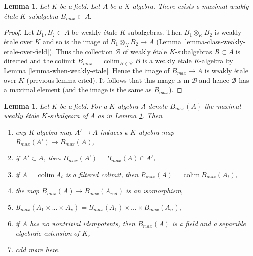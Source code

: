 \documentclass{amsart}
\theoremstyle{plain}
\newtheorem{lemma}[subsection]{Lemma}
\theoremstyle{definition}
\theoremstyle{remark}
\numberwithin{equation}{subsection}
\def\colim{\mathop{\mathrm{colim}}\nolimits}
\begin{document}
\begin{lemma}
\label{lemma-max-weakly-etale-subalgebra}
Let $K$ be a field. Let $A$ be a $K$-algebra. There exists
a maximal weakly \'etale $K$-subalgebra $B_{max} \subset A$.
\end{lemma}

\begin{proof}
Let $B_1, B_2 \subset A$ be weakly \'etale $K$-subalgebras.
Then $B_1 \otimes_K B_2$ is weakly \'etale over $K$
and so is the image of $B_1 \otimes_K B_2 \to A$
(Lemma \ref{lemma-class-weakly-etale-over-field}).
Thus the collection $\mathcal{B}$ of weakly \'etale $K$-subalgebras
$B \subset A$ is directed and the colimit
$B_{max} = \colim_{B \in \mathcal{B}} B$ is
a weakly \'etale $K$-algebra by Lemma \ref{lemma-when-weakly-etale}.
Hence the image of $B_{max} \to A$ is weakly \'etale over $K$
(previous lemma cited). It follows that this image is in $\mathcal{B}$
and hence $\mathcal{B}$ has a maximal element
(and the image is the same as $B_{max}$).
\end{proof}


\begin{lemma}
\label{lemma-properties-of-max-weakly-etale-subalgebra}
Let $K$ be a field. For a $K$-algebra $A$ denote $B_{max}(A)$
the maximal weakly \'etale $K$-subalgebra of $A$ as in
Lemma \ref{lemma-max-weakly-etale-subalgebra}. Then
\begin{enumerate}
\item any $K$-algebra map $A' \to A$ induces a $K$-algebra map
$B_{max}(A') \to B_{max}(A)$,
\item if $A' \subset A$, then $B_{max}(A') = B_{max}(A) \cap A'$,
\item if $A = \colim A_i$ is a filtered colimit, then
$B_{max}(A) = \colim B_{max}(A_i)$,
\item the map $B_{max}(A) \to B_{max}(A_{red})$ is an isomorphism,
\item $B_{max}(A_1 \times \ldots \times A_n) =
B_{max}(A_1) \times \ldots \times B_{max}(A_n)$,
\item if $A$ has no nontrivial idempotents, then $B_{max}(A)$ is a
field and a separable algebraic extension of $K$,
\item add more here.
\end{enumerate}
\end{lemma}
\end{document}
